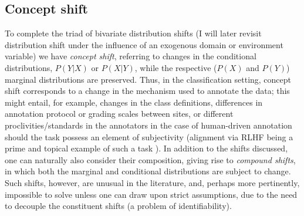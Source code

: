 \subsection{Concept shift}\label{ssec:concept-shift}
To complete the triad of bivariate distribution shifts (I will later revisit distribution shift
under the influence of an exogenous domain or environment variable) we have \emph{concept shift},
referring to changes in the conditional distributions, \( P(Y|X) \) or \( P(X|Y) \), while the
respective (\( P(X) \) and \( P(Y) \)) marginal distributions are preserved.
%
Thus, in the classification setting, concept shift corresponds to a change in the mechanism used to
annotate the data; this might entail, for example, changes in the class definitions, differences in
annotation protocol or grading scales between sites,  or different proclivities/standards in the
annotators in the case of human-driven annotation should the task possess an element of
subjectivity (alignment via \ac{RLHF} being a prime and topical example of such a task
\citep{bai2022training}).
%
In addition to the shifts discussed, one can naturally also consider their composition, giving rise
to \emph{compound shifts}, in which both the marginal and conditional distributions are subject to
change. Such shifts, however, are unusual in the literature, and, perhaps more pertinently,
impossible to solve unless one can draw upon strict assumptions, due to the need to decouple the
constituent shifts (a problem of identifiability).
%

